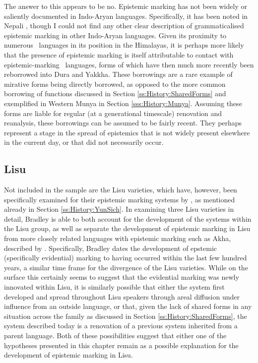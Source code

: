 The answer to this appears to be no. Epistemic marking has not been widely or saliently documented in Indo-Aryan languages. Specifically, it has been noted in Nepali \cite{Bashir2006}, though I could not find any other clear description of grammaticalised epistemic marking in other Indo-Aryan languages. Given its proximity to numerous \lfam\ languages in its position in the Himalayas, it is perhaps more likely that the presence of epistemic marking is itself attributable to contact with epistemic-marking \lfam\ languages, forms of which have then much more recently been reborrowed into Dura and Yakkha. These borrowings are a rare example of mirative forms being directly borrowed, as opposed to the more common borrowing of functions discussed in Section \ref{ss:History:SharedForms} and exemplified in Western Munya in Section \ref{sss:History:Munya}. Assuming these forms are liable for regular (at a generational timescale) renovation and reanalysis, these borrowings can be assumed to be fairly recent. They perhaps represent a stage in the spread of epistemics that is not widely present elsewhere in the current day, or that did not necessarily occur.

\subsection{Lisu}
Not included in the sample are the Lisu varieties, which have, however, been specifically examined for their epistemic marking systems by , as mentioned already in Section \ref{ss:History:YunSich}. In examining three Lisu varieties in detail, Bradley is able to both account for the development of the systems within the Lisu group, as well as separate the development of epistemic marking in Lisu from more closely related languages with epistemic marking such as Akha, described by . Specifically, Bradley dates the development of epstemic (specifically evidential) marking to having occurred within the last few hundred years, a similar time frame for the divergence of the Lisu varieties. While on the surface this certainly seems to suggest that the evidential marking was newly innovated within Lisu, it is similarly possible that either the system first developed and spread throughout Lisu speakers through areal diffusion under influence from an outside language, or that, given the lack of shared forms in any situation across the family as discussed in Section \ref{ss:History:SharedForms}, the system described today is a renovation of a previous system inherited from a parent language. Both of these possibilities suggest that either one of the hypotheses presented in this chapter remain as a possible explanation for the development of epistemic marking in Lisu.

